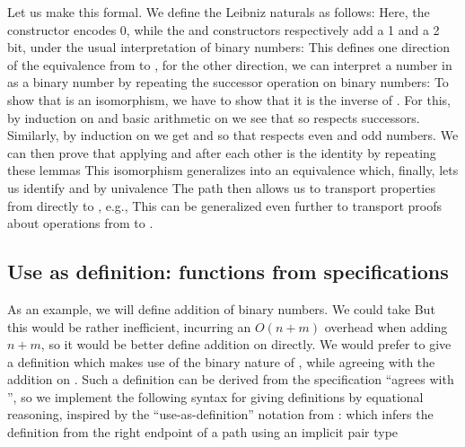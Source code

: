 Let us make this formal. We define the Leibniz naturals as follows:
Here, the  constructor encodes 0, while the  and  constructors respectively add a 1 and a 2 bit, under the usual interpretation of binary numbers:
This defines one direction of the equivalence from \bN{} to \bL{}, for the other direction, we can interpret a number in \bN{} as a binary number by repeating the successor operation on binary numbers:
To show that  is an isomorphism, we have to show that it is the inverse of . For this, by induction on \bL{} and basic arithmetic on \bN{} we see that
so  respects successors. Similarly, by induction on \bN{} we get
and %
so that  respects even and odd numbers. We can then prove that applying  and  after each other is the identity by repeating these lemmas
This isomorphism generalizes into an equivalence
which, finally, lets us identify \bN{} and \bL{} by univalence
The path  then allows us to transport properties from \bN{} directly to \bL{}, e.g.,
This can be generalized even further to transport proofs about operations from \bN{} to \bL{}. 

\subsection{Use as definition: functions from specifications}\label{ssec:useas}
As an example, we will define addition of binary numbers. We could take
But this would be rather inefficient, incurring an $O(n + m)$ overhead when adding $n + m$, so it would be better define addition on \bL{} directly. We would prefer to give a definition which makes use of the binary nature of \bL{}, while agreeing with the addition on \bN{}. Such a definition can be derived from the specification ``agrees with \AgdaFunction{\_+\_}'', so we implement the following syntax for giving definitions by equational reasoning, inspired by the ``use-as-definition'' notation from \cite{calcdata}:
which infers the definition from the right endpoint of a path using an implicit pair type

